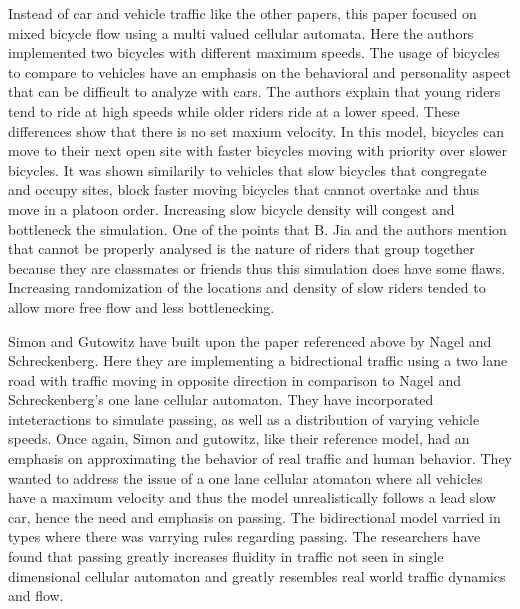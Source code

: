 \documentclass[sigplan,screen]{acmart}
\begin{document}

Instead of car and vehicle traffic like the other papers, this paper focused on
mixed bicycle flow using a multi valued cellular automata.
\cite{jia_multi-value_2007} Here the authors implemented two bicycles with
different maximum speeds. The usage of bicycles to compare to vehicles have an
emphasis on the behavioral and personality aspect that can be difficult to
analyze with cars. The authors explain that young riders tend to ride at high
speeds while older riders ride at a lower speed. These differences show that
there is no set maxium velocity. In this model, bicycles can move to their next
open site with faster bicycles moving with priority over slower bicycles. It was
shown similarily to vehicles that slow bicycles that congregate and occupy
sites, block faster moving bicycles that cannot overtake and thus move in a
platoon order. Increasing slow bicycle density will congest and bottleneck the
simulation. One of the points that B. Jia and the authors mention that cannot be
properly analysed is the nature of riders that group together because they are
classmates or friends thus this simulation does have some flaws. Increasing
randomization of the locations and density of slow riders tended to allow more
free flow and less bottlenecking.



Simon and Gutowitz have built upon the paper referenced above by Nagel and
Schreckenberg. \cite{simon_cellular_1998-1} Here they are implementing a
bidrectional traffic using a two lane road with traffic moving in opposite
direction in comparison to Nagel and Schreckenberg's one lane cellular
automaton. They have incorporated inteteractions to simulate passing, as well as
a distribution of varying vehicle speeds. Once again, Simon and gutowitz, like
their reference model, had an emphasis on approximating the behavior of real
traffic and human behavior. They wanted to address the issue of a one lane
cellular atomaton where all vehicles have a maximum velocity and thus the model
unrealistically follows a lead slow car, hence the need and emphasis on passing.
The bidirectional model varried in types where there was varrying rules
regarding passing. The researchers have found that passing greatly increases
fluidity in traffic not seen in single dimensional cellular automaton and
greatly resembles real world traffic dynamics and flow.
          
\end{document}
